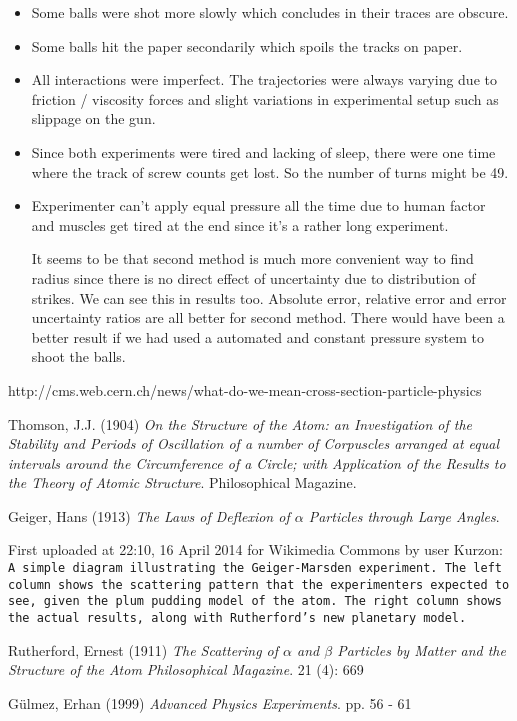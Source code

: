 \documentclass[a4paper]{article}
\begin{document}
\begin{multicols}{2}
\begin{itemize}
\item Some balls were shot more slowly which concludes in their traces are obscure.

\item Some balls hit the paper secondarily which spoils the tracks on paper.

\item All interactions were imperfect. The trajectories were always varying due to friction / viscosity forces and slight variations in experimental setup such as  slippage on the gun. 

\item Since both experiments were tired and lacking of sleep, there were one time where the track of screw counts get lost. So the number of turns might be 49.

\item Experimenter can't apply equal pressure all the time due to human factor and muscles get tired at the end since it's a rather long experiment. 

It seems to be that second method is much more convenient way to find radius since there is no direct effect of uncertainty due to distribution of strikes. We can see this in results too. Absolute error, relative error and error uncertainty ratios are all better for second method. There would have been a better result if we had used a automated and constant pressure system to shoot the balls.

\end{itemize}

\end{multicols}

\begin{thebibliography}{9}

 http://cms.web.cern.ch/news/what-do-we-mean-cross-section-particle-physics

  Thomson, J.J. (1904) \textit{On the Structure of the Atom: an Investigation of the Stability and Periods of Oscillation of a number of Corpuscles arranged at equal intervals around the Circumference of a Circle; with Application of the Results to the Theory of Atomic Structure}. Philosophical Magazine.

 Geiger, Hans (1913) \textit{The Laws of Deflexion of $\alpha$ Particles through Large Angles}.

 First uploaded at 22:10, 16 April 2014 for Wikimedia Commons by user Kurzon: \texttt{A simple diagram illustrating the Geiger-Marsden experiment. The left column shows the scattering pattern that the experimenters expected to see, given the plum pudding model of the atom. The right column shows the actual results, along with Rutherford's new planetary model.}

 Rutherford, Ernest (1911) \textit{The Scattering of $\alpha$ and $\beta$ Particles by Matter and the Structure of the Atom Philosophical Magazine}. 21 (4): 669

Gülmez, Erhan (1999) \textit{Advanced Physics Experiments}. pp. 56 - 61

\end{thebibliography}
\end{document}
